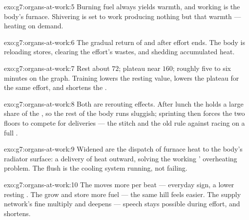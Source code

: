 \begin{solution}{exo:g7:organs-at-work:5}
Burning fuel always yields warmth, and working  is
the body's furnace. Shivering is  set to work
producing nothing but that warmth --- heating on demand.
\end{solution}

\begin{solution}{exo:g7:organs-at-work:6}
The gradual return of  and  after effort
ends. The body is reloading  stores, clearing the
effort's wastes, and shedding accumulated heat.
\end{solution}

\begin{solution}{exo:g7:organs-at-work:7}
Rest about $72$; plateau near $160$;  roughly five
to six minutes on the graph. Training lowers the resting
value, lowers the plateau for the same effort, and
shortens the .
\end{solution}

\begin{solution}{exo:g7:organs-at-work:8}
Both are rerouting effects. After lunch the  holds a large share of the , so the rest of the
body runs sluggish; sprinting then forces the two floors
to compete for deliveries --- the stitch and the old rule
against racing on a full .
\end{solution}

\begin{solution}{exo:g7:organs-at-work:9}
Widened   are the dispatch of furnace heat to
the body's radiator surface: a delivery of heat outward,
solving the working ' overheating problem. The
flush is the cooling system running, not failing.
\end{solution}

\begin{solution}{exo:g7:organs-at-work:10}
The  moves more  per beat --- everyday sign, a
lower resting . The  grow and store more fuel
--- the same hill feels easier. The supply network's fine
 multiply and  deepens --- speech stays
possible during effort, and  shortens.
\end{solution}

